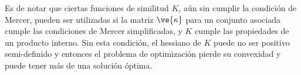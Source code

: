 Es de notar que ciertas funciones de similitud $K$, aún sin cumplir la condición de Mercer, pueden ser utilizadas si la matriz $\ve{\kappa}$ para un conjunto asociada cumple las condiciones de Mercer simplificadas, y  $K$ cumple las propiedades de un producto interno. Sin esta condición, el hessiano de $K$ puede no ser positivo semi-definido y entonces el problema de optimización pierde su convexidad y puede tener más de una solución óptima.
  
  

